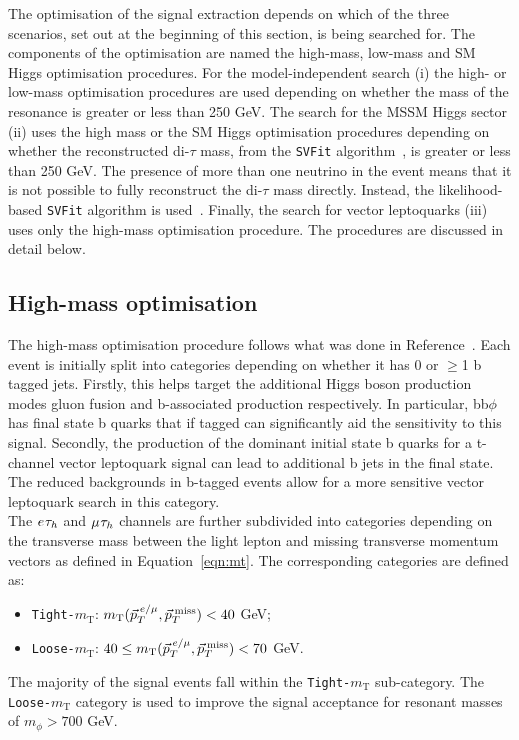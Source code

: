 The optimisation of the signal extraction depends on which of the three scenarios, set out at the beginning of this section, is being searched for.
The components of the optimisation are named the high-mass, low-mass and \ac{SM} Higgs optimisation procedures.
For the model-independent search (i) the high- or low-mass optimisation procedures are used depending on whether the mass of the resonance is greater or less than 250 GeV.
The search for the \ac{MSSM} Higgs sector (ii) uses the high mass or the \ac{SM} Higgs optimisation procedures depending on whether the reconstructed di-$\tau$ mass, from the \texttt{SVFit} algorithm~\cite{Bianchini:2014vza}, is greater or less than 250 GeV.
The presence of more than one neutrino in the event means that it is not possible to fully reconstruct the di-$\tau$ mass directly.
Instead, the likelihood-based \texttt{SVFit} algorithm is used~\cite{Bianchini:2014vza}.
Finally, the search for vector leptoquarks (iii) uses only the high-mass optimisation procedure.
The procedures are discussed in detail below. \\

\subsection{High-mass optimisation}
\label{sec:high_mass_optimisation}

The high-mass optimisation procedure follows what was done in Reference~\cite{CMS_MSSM_Tau_2018}.
Each event is initially split into categories depending on whether it has 0 or $\geq$1 b tagged jets.
Firstly, this helps target the additional Higgs boson production modes gluon fusion and b-associated production respectively.
In particular, bb$\phi$ has final state b quarks that if tagged can significantly aid the sensitivity to this signal.
Secondly, the production of the dominant initial state b quarks for a t-channel vector leptoquark signal can lead to additional b jets in the final state.
The reduced backgrounds in b-tagged events allow for a more sensitive vector leptoquark search in this category. \\

The $e_{}\tau_{h}$ and $\mu_{}\tau_{h}$ channels are further subdivided into categories depending on the transverse mass between the light lepton and missing transverse momentum vectors as defined in Equation~\ref{eqn:mt}.
The corresponding categories are defined as:
\begin{itemize}
\item \texttt{Tight-$m_{\text{T}}$}: $m_{\text{T}}(\vec{p}_{T}^{\hspace{2pt}e/\mu},\vec{p}_{T}^{\hspace{2pt}\text{miss}}) < 40$ GeV;
\item \texttt{Loose-$m_{\text{T}}$}: $40 \leq m_{\text{T}}(\vec{p}_{T}^{\hspace{2pt}e/\mu},\vec{p}_{T}^{\hspace{2pt}\text{miss}}) < 70$ GeV.
\end{itemize}
The majority of the signal events fall within the \texttt{Tight-$m_{\text{T}}$} sub-category.
The \texttt{Loose-$m_{\text{T}}$} category is used to improve the signal acceptance for resonant masses of $m_{\phi} > 700$ GeV.\\

